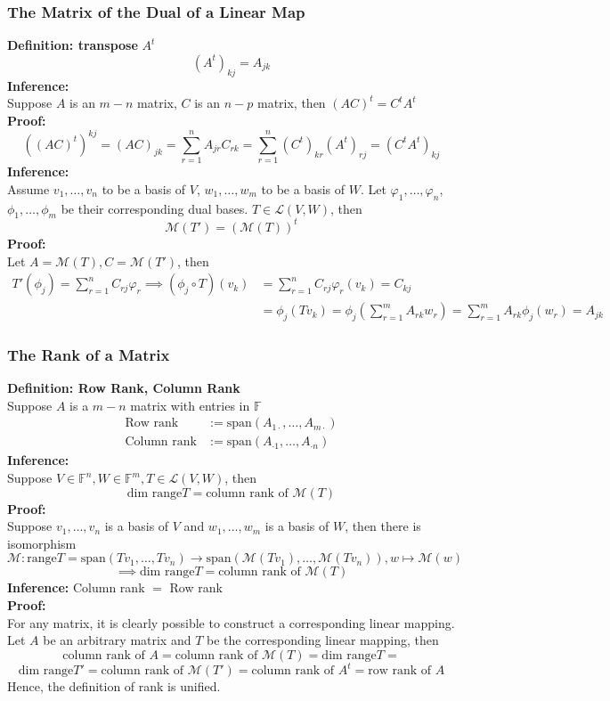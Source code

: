 \documentclass{article}
\newcommand{\F}{\mathbb{F}}
\newcommand{\0}{{\bf{0}}}
\begin{document}
\subsubsection{The Matrix of the Dual of a Linear Map}
\textbf{Definition: transpose} $A^t$
$$(A^t)_{kj}=A_{jk}$$
\textbf{Inference:}\\
Suppose $A$ is an $m-n$ matrix, $C$ is an $n-p$ matrix, then $(AC)^t=C^tA^t$\\
\textbf{Proof:}
$$((AC)^t)^{kj}=(AC)_{jk}=\sum_{r=1}^nA_{jr}C_{rk}=\sum_{r=1}^n(C^t)_{kr}(A^t)_{rj}=(C^tA^t)_{kj}$$
\textbf{Inference:}\\
Assume $v_1,\dots,v_n$ to be a basis of $V$, $w_1,\dots,w_m$ to be a basis of $W$. Let $\varphi_1,\dots,\varphi_n$, $\phi_1,\dots,\phi_m$ be their corresponding dual bases. $T\in\mathcal{L}(V,W)$, then
$$\mathcal{M}(T')=(\mathcal{M}(T))^t$$
\textbf{Proof:}\\
Let $A=\mathcal{M}(T),C=\mathcal{M}(T')$, then
\begin{equation}
\begin{split}
    T'(\phi_j)=\sum_{r=1}^nC_{rj}\varphi_r\implies(\phi_j\circ T)(v_k)&=\sum_{r=1}^nC_{rj}\varphi_r(v_k)=C_{kj}\\
    &=\phi_j(Tv_k)=\phi_j\left(\sum_{r=1}^mA_{rk}w_r\right)=\sum_{r=1}^mA_{rk}\phi_j(w_r)=A_{jk}
\end{split}
\end{equation}
\subsubsection{The Rank of a Matrix}
\textbf{Definition: Row Rank, Column Rank}\\
Suppose $A$ is a $m-n$ matrix with entries in $\F$
\begin{equation}
\begin{split}
    \mbox{Row rank}&:=\mbox{span}(A_{1\cdot},\dots,A_{m\cdot})\\
    \mbox{Column rank}&:=\mbox{span}(A_{\cdot1},\dots,A_{\cdot n})
\end{split}
\end{equation}
\textbf{Inference:}\\
Suppose $V\in\F^n,W\in\F^m,T\in\mathcal{L}(V,W)$, then
$$\mbox{dim range}T=\mbox{column rank of }\mathcal{M}(T)$$
\textbf{Proof:}\\
Suppose $v_1,\dots,v_n$ is a basis of $V$ and $w_1,\dots,w_m$ is a basis of $W$, then there is isomorphism
$$\mathcal{M}:\mbox{range}T=\mbox{span}(Tv_1,\dots,Tv_n)\to\mbox{span}(\mathcal{M}(Tv_1),\dots,\mathcal{M}(Tv_n)),w\mapsto\mathcal{M}(w)$$
$$\implies\mbox{dim range}T=\mbox{column rank of }\mathcal{M}(T)$$
\textbf{Inference:} Column rank $=$ Row rank\\
\textbf{Proof:}\\
For any matrix, it is clearly possible to construct a corresponding linear mapping. Let $A$ be an arbitrary matrix and $T$ be the corresponding linear mapping, then
$$\mbox{column rank of }A=\mbox{column rank of }\mathcal{M}(T)=\mbox{dim range}T=$$
$$\mbox{dim range}T'=\mbox{column rank of }\mathcal{M}(T')=\mbox{column rank of }A^t=\mbox{row rank of }A$$
Hence, the definition of rank is unified.
\end{document}
